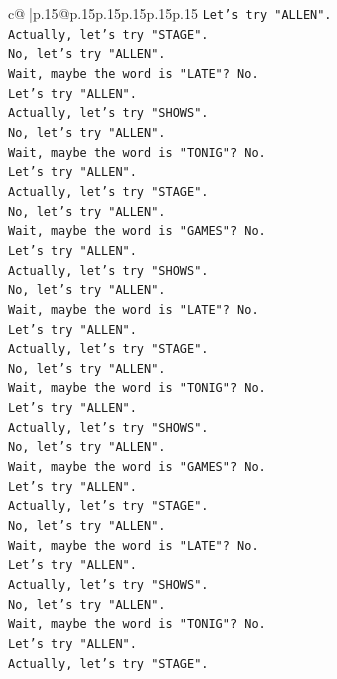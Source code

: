 \documentclass{article}
\begin{document}
{\begin{supertabular}{c@{$\;$}|p{.15\linewidth}@{}p{.15\linewidth}p{.15\linewidth}p{.15\linewidth}p{.15\linewidth}p{.15\linewidth}}
{{{\texttt{Let's try "ALLEN".} \\
\texttt{Actually, let's try "STAGE".} \\
\texttt{No, let's try "ALLEN".} \\
\texttt{Wait, maybe the word is "LATE"? No.} \\
\texttt{Let's try "ALLEN".} \\
\texttt{Actually, let's try "SHOWS".} \\
\texttt{No, let's try "ALLEN".} \\
\texttt{Wait, maybe the word is "TONIG"? No.} \\
\texttt{Let's try "ALLEN".} \\
\texttt{Actually, let's try "STAGE".} \\
\texttt{No, let's try "ALLEN".} \\
\texttt{Wait, maybe the word is "GAMES"? No.} \\
\texttt{Let's try "ALLEN".} \\
\texttt{Actually, let's try "SHOWS".} \\
\texttt{No, let's try "ALLEN".} \\
\texttt{Wait, maybe the word is "LATE"? No.} \\
\texttt{Let's try "ALLEN".} \\
\texttt{Actually, let's try "STAGE".} \\
\texttt{No, let's try "ALLEN".} \\
\texttt{Wait, maybe the word is "TONIG"? No.} \\
\texttt{Let's try "ALLEN".} \\
\texttt{Actually, let's try "SHOWS".} \\
\texttt{No, let's try "ALLEN".} \\
\texttt{Wait, maybe the word is "GAMES"? No.} \\
\texttt{Let's try "ALLEN".} \\
\texttt{Actually, let's try "STAGE".} \\
\texttt{No, let's try "ALLEN".} \\
\texttt{Wait, maybe the word is "LATE"? No.} \\
\texttt{Let's try "ALLEN".} \\
\texttt{Actually, let's try "SHOWS".} \\
\texttt{No, let's try "ALLEN".} \\
\texttt{Wait, maybe the word is "TONIG"? No.} \\
\texttt{Let's try "ALLEN".} \\
\texttt{Actually, let's try "STAGE".} \\
}}}
\end{supertabular}}
\end{document}
